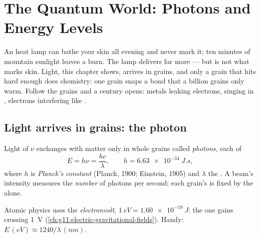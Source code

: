 \chapter{The Quantum World: Photons and Energy Levels}\label{ch:g12:quantum-world}

An  heat lamp can bathe your skin all evening and never mark it; ten
minutes of  mountain sunlight leaves a burn. The lamp delivers far more
 --- but  is not what marks skin. Light, this chapter shows,
arrives in grains, and only a grain that hits hard enough does chemistry:
one  grain snaps a bond that a billion  grains only warm.
Follow the grains and a century opens: metals leaking electrons, 
singing in , electrons interfering like .

\section{Light arrives in grains: the photon}

\begin{definition}\label{def:g12:quantum-world:photon}
Light of  $\nu$ exchanges  with matter only in whole grains
called \emph{photons}, each of 
\[
E = h\nu = \frac{hc}{\lambda}, \qquad h = \qty{6.63e-34}{J.s},
\]
where $h$ is \emph{Planck's constant} (Planck,
1900; Einstein, 1905) and $\lambda$ the . A beam's
intensity measures the \emph{number} of photons per second; each grain's
 is fixed by the  alone.
\end{definition}

\begin{notation}\label{not:g12:quantum-world:ev}
Atomic physics uses the \emph{electronvolt},
$\qty{1}{eV} = \qty{1.60e-19}{J}$: the  one  gains
crossing \qty{1}{V} (\cref{ch:g11:electric-gravitational-fields}). Handy:
$E \,(\unit{eV}) \approx 1240/\lambda\,(\unit{nm})$.
\end{notation}

